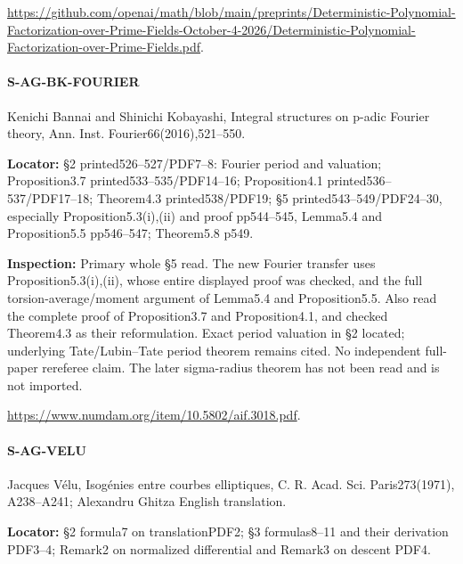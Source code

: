 \documentclass[11pt,a4paper]{article}
\begin{document}
\url{https://github.com/openai/math/blob/main/preprints/Deterministic-Polynomial-Factorization-over-Prime-Fields-October-4-2026/Deterministic-Polynomial-Factorization-over-Prime-Fields.pdf}.

\paragraph{S-AG-BK-FOURIER} Kenichi Bannai and Shinichi Kobayashi, Integral structures on p-adic Fourier theory, Ann.\allowbreak{} Inst.\allowbreak{} Fourier66(2016),521–\allowbreak{}550.

\textbf{Locator:} §2 printed526–\allowbreak{}527/\allowbreak{}PDF7–\allowbreak{}8:\allowbreak{} Fourier period and valuation; Proposition3.\allowbreak{}7 printed533–\allowbreak{}535/\allowbreak{}PDF14–\allowbreak{}16; Proposition4.\allowbreak{}1 printed536–\allowbreak{}537/\allowbreak{}PDF17–\allowbreak{}18; Theorem4.\allowbreak{}3 printed538/\allowbreak{}PDF19; §5 printed543–\allowbreak{}549/\allowbreak{}PDF24–\allowbreak{}30, especially Proposition5.\allowbreak{}3(i),(ii) and proof pp544–\allowbreak{}545, Lemma5.\allowbreak{}4 and Proposition5.\allowbreak{}5 pp546–\allowbreak{}547; Theorem5.\allowbreak{}8 p549.

\textbf{Inspection:} Primary whole §5 read.\allowbreak{} The new Fourier transfer uses Proposition5.\allowbreak{}3(i),(ii), whose entire displayed proof was checked, and the full torsion-average/\allowbreak{}moment argument of Lemma5.\allowbreak{}4 and Proposition5.\allowbreak{}5.\allowbreak{} Also read the complete proof of Proposition3.\allowbreak{}7 and Proposition4.\allowbreak{}1, and checked Theorem4.\allowbreak{}3 as their reformulation.\allowbreak{} Exact period valuation in §2 located; underlying Tate/\allowbreak{}Lubin–\allowbreak{}Tate period theorem remains cited.\allowbreak{} No independent full-paper rereferee claim.\allowbreak{} The later sigma-radius theorem has not been read and is not imported.\allowbreak{}

\url{https://www.numdam.org/item/10.5802/aif.3018.pdf}.

\paragraph{S-AG-VELU} Jacques Vélu, Isogénies entre courbes elliptiques, C.\allowbreak{} R.\allowbreak{} Acad.\allowbreak{} Sci.\allowbreak{} Paris273(1971), A238–\allowbreak{}A241; Alexandru Ghitza English translation.

\textbf{Locator:} §2 formula7 on translationPDF2; §3 formulas8–\allowbreak{}11 and their derivation PDF3–\allowbreak{}4; Remark2 on normalized differential and Remark3 on descent PDF4.
\end{document}
